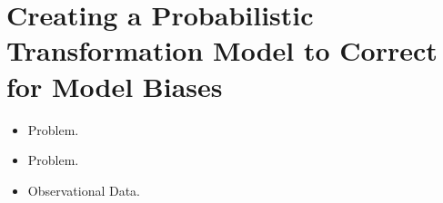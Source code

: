 
\section{Creating a Probabilistic Transformation Model to Correct for Model Biases}
\label{sec:5_Transform}


\begin{itemize}
\item Problem.
\item Problem.
\item Observational Data.
\end{itemize}
